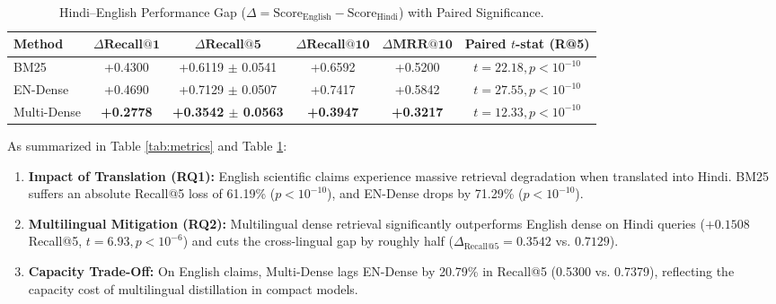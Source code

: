 \documentclass[11pt,a4paper]{article}
\begin{document}
\begin{table}[ht]
\centering
\small
\caption{Hindi--English Performance Gap ($\Delta = \text{Score}_{\text{English}} - \text{Score}_{\text{Hindi}}$) with Paired Significance.}
\label{tab:gap}
\begin{tabular}{lccccc}
\toprule
\textbf{Method} & $\Delta\textbf{Recall@1}$ & $\Delta\textbf{Recall@5}$ & $\Delta\textbf{Recall@10}$ & $\Delta\textbf{MRR@10}$ & \textbf{Paired $t$-stat (R@5)} \\
\midrule
BM25 & +0.4300 & +0.6119 $\pm$ 0.0541 & +0.6592 & +0.5200 & $t = 22.18, p < 10^{-10}$ \\
EN-Dense & +0.4690 & +0.7129 $\pm$ 0.0507 & +0.7417 & +0.5842 & $t = 27.55, p < 10^{-10}$ \\
Multi-Dense & \textbf{+0.2778} & \textbf{+0.3542 $\pm$ 0.0563} & \textbf{+0.3947} & \textbf{+0.3217} & $t = 12.33, p < 10^{-10}$ \\
\bottomrule
\end{tabular}
\end{table}

As summarized in Table \ref{tab:metrics} and Table \ref{tab:gap}:
\begin{enumerate}
    \item \textbf{Impact of Translation (RQ1):} English scientific claims experience massive retrieval degradation when translated into Hindi. BM25 suffers an absolute Recall@5 loss of 61.19\% ($p < 10^{-10}$), and EN-Dense drops by 71.29\% ($p < 10^{-10}$).
    \item \textbf{Multilingual Mitigation (RQ2):} Multilingual dense retrieval significantly outperforms English dense on Hindi queries ($+0.1508$ Recall@5, $t = 6.93, p < 10^{-6}$) and cuts the cross-lingual gap by roughly half ($\Delta_{\text{Recall@5}} = 0.3542$ vs. $0.7129$).
    \item \textbf{Capacity Trade-Off:} On English claims, Multi-Dense lags EN-Dense by 20.79\% in Recall@5 (0.5300 vs. 0.7379), reflecting the capacity cost of multilingual distillation in compact models.
\end{enumerate}
\end{document}
